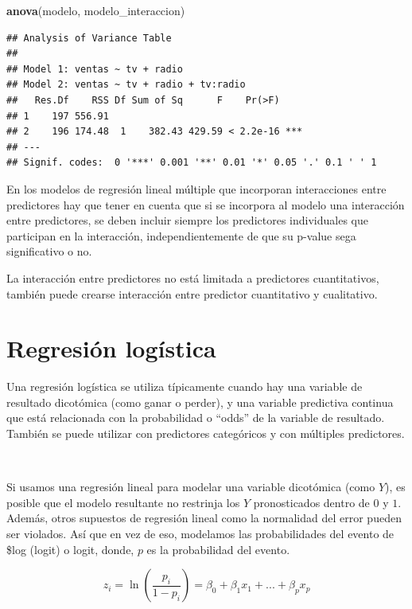 \documentclass[]{book}
\newenvironment{Shaded}{\begin{snugshade}}{\end{snugshade}}
\newcommand{\KeywordTok}[1]{\textcolor[rgb]{0.13,0.29,0.53}{\textbf{#1}}}
\newcommand{\NormalTok}[1]{#1}
\begin{document}
\begin{Shaded}
\begin{Highlighting}[]
\KeywordTok{anova}\NormalTok{(modelo, modelo_interaccion)}
\end{Highlighting}
\end{Shaded}

\begin{verbatim}
## Analysis of Variance Table
## 
## Model 1: ventas ~ tv + radio
## Model 2: ventas ~ tv + radio + tv:radio
##   Res.Df    RSS Df Sum of Sq      F    Pr(>F)    
## 1    197 556.91                                  
## 2    196 174.48  1    382.43 429.59 < 2.2e-16 ***
## ---
## Signif. codes:  0 '***' 0.001 '**' 0.01 '*' 0.05 '.' 0.1 ' ' 1
\end{verbatim}

En los modelos de regresión lineal múltiple que incorporan interacciones
entre predictores hay que tener en cuenta que si se incorpora al modelo
una interacción entre predictores, se deben incluir siempre los
predictores individuales que participan en la interacción,
independientemente de que su p-value sega significativo o no.

La interacción entre predictores no está limitada a predictores
cuantitativos, también puede crearse interacción entre predictor
cuantitativo y cualitativo.

\chapter{Regresión logística}\label{regresiuxf3n-loguxedstica}

Una regresión logística se utiliza típicamente cuando hay una variable
de resultado dicotómica (como ganar o perder), y una variable predictiva
continua que está relacionada con la probabilidad o ``odds'' de la
variable de resultado. También se puede utilizar con predictores
categóricos y con múltiples predictores.

~

Si usamos una regresión lineal para modelar una variable dicotómica
(como \(Y\)), es posible que el modelo resultante no restrinja los \(Y\)
pronosticados dentro de \(0\) y \(1\). Además, otros supuestos de
regresión lineal como la normalidad del error pueden ser violados. Así
que en vez de eso, modelamos las probabilidades del evento de \$log
(logit) o logit, donde, \(p\) es la probabilidad del evento.

\[
    z_i = \ln(\frac{p_i}{1-p_i}) =   \beta_0 + \beta_1 x_1 + ... + \beta_p x_p
\]
\end{document}
